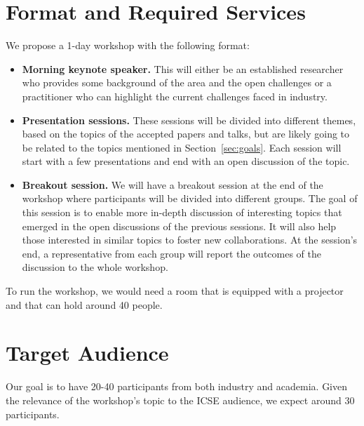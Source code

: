 \documentclass[10pt, conference]{IEEEtran}
\begin{document}
\section{Format and Required Services}

We propose a 1-day workshop with the following format:

\begin{itemize}
\setlength\itemsep{5pt}
\item \textbf{Morning keynote speaker.} This will either be an established researcher who provides some background of the area and the open challenges or a practitioner who can highlight the current challenges faced in industry.
\item \textbf{Presentation sessions.} These sessions will be divided into different themes, based on the topics of the accepted papers and talks, but are likely going to be related to the topics mentioned in Section~\ref{sec:goals}. Each session will start with a few presentations and end with an open discussion of the topic. 
\item \textbf{Breakout session.} We will have a breakout session at the end of the workshop where participants will be divided into different groups. The goal of this session is to enable more in-depth discussion of interesting topics that emerged in the open discussions of the previous sessions. It will also help those interested in similar topics to foster new collaborations. At the session's end, a representative from each group will report the outcomes of the discussion to the whole workshop.
\end{itemize}

To run the workshop, we would need a room that is equipped with a projector and that can hold around 40 people.

\section{Target Audience}

Our goal is to have 20-40 participants from both industry and academia. Given the relevance of the workshop's topic to the ICSE audience, we expect around 30 participants.
\end{document}
